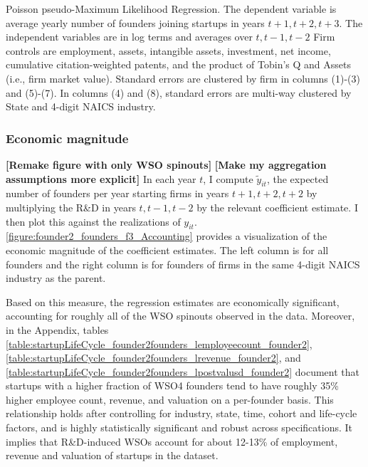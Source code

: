 \documentclass[11pt,english]{article}
\begin{document}
\begin{table}[!htb]
	\scriptsize
	\centering
	
	\caption{Poisson pseudo-Maximum Likelihood Regression. The dependent variable is average yearly number of founders joining startups in years $t+1,t+2,t+3$. The independent variables are in log terms and averages over $t,t-1,t-2$ Firm controls are employment, assets, intangible assets, investment, net income, cumulative citation-weighted patents, and the product of Tobin's Q and Assets (i.e., firm market value). Standard errors are clustered by firm in columns (1)-(3) and (5)-(7). In columns (4) and (8), standard errors are multi-way clustered by State and 4-digit NAICS industry.}
	\label{table:RDandSpinoutFormation_ppml_absolute_founder2_l3f3}
\end{table}

\subsubsection{Economic magnitude}

\textbf{[Remake figure with only WSO spinouts]} \textbf{[Make my aggregation assumptions more explicit]} In each year $t$, I compute $\tilde{y}_{it}$, the expected number of founders per year starting firms in years $t+1,t+2,t+2$ by multiplying the R\&D in years $t,t-1,t-2$ by the relevant coefficient estimate. I then plot this against the realizations of $y_{it}$.  \autoref{figure:founder2_founders_f3_Accounting} provides a visualization of the economic magnitude of the coefficient estimates. The left column is for all founders and the right column is for founders of firms in the same 4-digit NAICS industry as the parent. 

Based on this measure, the regression estimates are economically significant, accounting for roughly all of the WSO spinouts observed in the data. Moreover, in the Appendix, tables \ref{table:startupLifeCycle_founder2founders_lemployeecount_founder2}, \ref{table:startupLifeCycle_founder2founders_lrevenue_founder2}, and \ref{table:startupLifeCycle_founder2founders_lpostvalusd_founder2} document that startups with a higher fraction of WSO4 founders tend to have roughly 35\% higher employee count, revenue, and valuation on a per-founder basis. This relationship holds after controlling for industry, state, time, cohort and life-cycle factors, and is highly statistically significant and robust across specifications. It implies that R\&D-induced WSOs account for about 12-13\% of employment, revenue and valuation of startups in the dataset.
\end{document}
